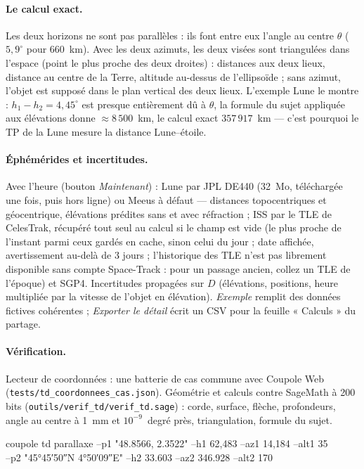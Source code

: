 \paragraph{Le calcul exact.} Les deux horizons ne sont pas parallèles : ils font entre eux l'angle au centre $\theta$
($5{,}9^\circ$ pour 660~km). Avec les deux azimuts, les deux visées sont triangulées dans l'espace (point le plus proche
des deux droites) : distances aux deux lieux, distance au centre de la Terre, altitude au-dessus de l'ellipsoïde ;
sans azimut, l'objet est supposé dans le plan vertical des deux lieux. L'exemple Lune le montre : $h_1 - h_2 = 4{,}45^\circ$
est presque entièrement dû à $\theta$, la formule du sujet appliquée aux élévations donne $\approx 8\,500$~km, le calcul
exact $357\,917$~km — c'est pourquoi le TP de la Lune mesure la distance Lune–étoile.

\paragraph{Éphémérides et incertitudes.} Avec l'heure (bouton \emph{Maintenant}) : Lune par JPL DE440 (32~Mo,
téléchargée une fois, puis hors ligne) ou Meeus à défaut — distances topocentriques et géocentrique, élévations
prédites sans et avec réfraction ; ISS par le TLE de CelesTrak, récupéré tout seul au calcul si le champ est vide (le plus proche de
l'instant parmi ceux gardés en cache, sinon celui du jour ; date affichée, avertissement au-delà de 3 jours ; l'historique des TLE n'est pas librement disponible sans
compte Space-Track : pour un passage ancien, collez un TLE de l'époque) et SGP4. Incertitudes propagées sur $D$
(élévations, positions, heure multipliée par la vitesse de l'objet en élévation). \emph{Exemple} remplit des données
fictives cohérentes ; \emph{Exporter le détail} écrit un CSV pour la feuille « Calculs » du partage.

\paragraph{Vérification.} Lecteur de coordonnées : une batterie de cas commune avec Coupole Web
(\texttt{tests/td\_coordonnees\_cas.json}). Géométrie et calculs contre SageMath à 200 bits
(\texttt{outils/verif\_td/verif\_td.sage}) : corde, surface, flèche, profondeurs, angle au centre à 1~mm et
$10^{-9}$~degré près, triangulation, formule du sujet.

\begin{ccode}
coupole td parallaxe --p1 "48.8566, 2.3522" --h1 62,483 --az1 14,184 --alt1 35\\
\hspace*{2em}--p2 "45°45′50″N 4°50′09″E" --h2 33.603 --az2 346.928 --alt2 170
\end{ccode}

